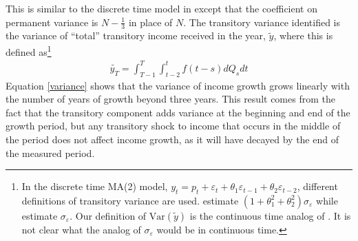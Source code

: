 \documentclass[titlepage]{\econtex}\newcommand{\texname}{ConsumptionHeterogeneity}
\begin{document}
This is similar to the discrete time model in \cite{carroll_nature_1997} except that the coefficient on permanent variance is $N-\frac{1}{3}$ in place of $N$. The transitory variance identified is the variance of ``total'' transitory income received in the year, $\tilde{y}$, where this is defined as\footnote{In the discrete time MA(2) model, $y_t = p_t + \varepsilon_t + \theta_1 \varepsilon_{t-1} + \theta_2 \varepsilon_{t-2}$, different definitions of transitory variance are used. \cite{carroll_nature_1997} estimate $(1+\theta_1^2 + \theta_2^2)\sigma_{\varepsilon}$ while \cite{blundell_consumption_2008} estimate $\sigma_{\varepsilon}$. Our definition of $\mathrm{Var}(\tilde{y})$ is the continuous time analog of \cite{carroll_nature_1997}. It is not clear what the analog of $\sigma_{\varepsilon}$ would be in continuous time.}
\begin{align}
\tilde{y_T} = \int_{T-1}^{T}\int_{t-2}^{t} f(t-s)dQ_s dt \label{tot_income}
\end{align}
Equation \ref{variance} shows that the variance of income growth grows linearly with the number of years of growth beyond three years. This result comes from the fact that the transitory component adds variance at the beginning and end of the growth period, but any transitory shock to income that occurs in the middle of the period does not affect income growth, as it will have decayed by the end of the measured period.
\end{document}
